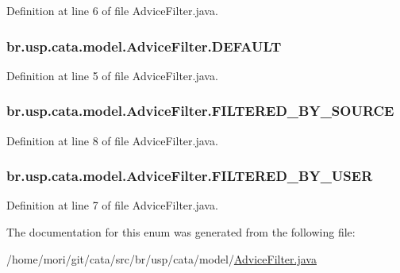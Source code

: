 Definition at line 6 of file Advice\+Filter.\+java.

\hypertarget{enumbr_1_1usp_1_1cata_1_1model_1_1_advice_filter_a177db1a9a904ae9c45c5a15bec2f744b}{
\subsubsection[{D\+E\+F\+A\+U\+L\+T}]{\setlength{\rightskip}{0pt plus 5cm}br.\+usp.\+cata.\+model.\+Advice\+Filter.\+D\+E\+F\+A\+U\+L\+T}}\label{enumbr_1_1usp_1_1cata_1_1model_1_1_advice_filter_a177db1a9a904ae9c45c5a15bec2f744b}


Definition at line 5 of file Advice\+Filter.\+java.

\hypertarget{enumbr_1_1usp_1_1cata_1_1model_1_1_advice_filter_a08375d1ac38221c8fb3193a7cb3aca10}{
\subsubsection[{F\+I\+L\+T\+E\+R\+E\+D\+\_\+\+B\+Y\+\_\+\+S\+O\+U\+R\+C\+E}]{\setlength{\rightskip}{0pt plus 5cm}br.\+usp.\+cata.\+model.\+Advice\+Filter.\+F\+I\+L\+T\+E\+R\+E\+D\+\_\+\+B\+Y\+\_\+\+S\+O\+U\+R\+C\+E}}\label{enumbr_1_1usp_1_1cata_1_1model_1_1_advice_filter_a08375d1ac38221c8fb3193a7cb3aca10}


Definition at line 8 of file Advice\+Filter.\+java.

\hypertarget{enumbr_1_1usp_1_1cata_1_1model_1_1_advice_filter_a0dbcc1f42eed6b783122cb2271eaecfa}{
\subsubsection[{F\+I\+L\+T\+E\+R\+E\+D\+\_\+\+B\+Y\+\_\+\+U\+S\+E\+R}]{\setlength{\rightskip}{0pt plus 5cm}br.\+usp.\+cata.\+model.\+Advice\+Filter.\+F\+I\+L\+T\+E\+R\+E\+D\+\_\+\+B\+Y\+\_\+\+U\+S\+E\+R}}\label{enumbr_1_1usp_1_1cata_1_1model_1_1_advice_filter_a0dbcc1f42eed6b783122cb2271eaecfa}


Definition at line 7 of file Advice\+Filter.\+java.



The documentation for this enum was generated from the following file\+:\begin{DoxyCompactItemize}
\item 
/home/mori/git/cata/src/br/usp/cata/model/\hyperlink{_advice_filter_8java}{Advice\+Filter.\+java}\end{DoxyCompactItemize}
